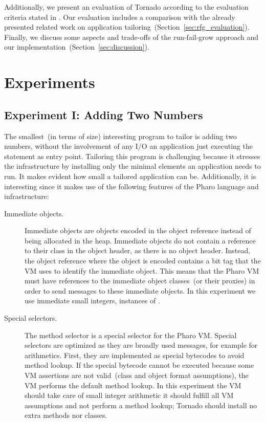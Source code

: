 Additionally, we present an evaluation of Tornado according to the evaluation criteria stated in . Our evaluation includes a comparison with the already presented related work on application tailoring~(Section~\ref{sec:rfg_evaluation}).
Finally, we discuss some aspects and trade-offs of the run-fail-grow approach and our implementation~(Section~\ref{sec:discussion}).

\section{Experiments}\label{sec:rfg_experiments}

\subsection*{Experiment I: Adding Two Numbers}

The smallest~(in terms of size) interesting program to tailor is adding two numbers, without the involvement of any I/O \ie an application just executing the  statement as entry point. Tailoring this program is challenging because it stresses the infrastructure by installing only the minimal elements an application needs to run. It makes evident how small a tailored application can be. Additionally, it is interesting since it makes use of the following features of the Pharo language and infrastructure:

\begin{description}
\item[Immediate objects.] Immediate objects are objects encoded in the object reference instead of being allocated in the heap. Immediate objects do not contain a reference to their class in the object header, as there is no object header. Instead, the object reference where the object is encoded contains a bit tag that the VM uses to identify the immediate object. This means that the Pharo VM must have references to the immediate object classes~(or their proxies) in order to send messages to these immediate objects. In this experiment we use immediate small integers, instances of .
\item[Special selectors.] The method selector \ct{+} is a special selector for the Pharo VM. Special selectors are optimized as they are broadly used messages, for example for arithmetics. First, they are implemented as special bytecodes to avoid method lookup. If the special bytecode cannot be executed because some VM assertions are not valid~(\eg class and object format assumptions), the VM performs the default method lookup. In this experiment the VM should take care of small integer arithmetic \ie it should fulfill all VM assumptions and not perform a method lookup; Tornado should install no extra methods nor classes.
\end{description}

